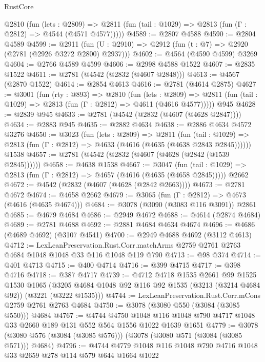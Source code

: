 \begin{lexlean}{RustCore}
\begin{coremodule}
    @2810
      (fun (lets : @2809) =>
      @2811 (fun (tail : @1029) => @2813 (fun (Γ : @2812) => @4544 (@4571 @4577)))))
@4589 := @2807 @4588
@4590 := @2804 @4589
@4599 := @2911 (fun (U : @2910) => @2912 (fun (t : @7) => @2920 (@2781 (@2926 @3272 @2800) @2937)))
@4602 := @4564 (@4590 @4599) @3269
@4604 := @2766 @4589 @4599
@4606 := @2998 @4588 @1522
@4607 := @2835 @1522
@4611 := @2781 (@4542 (@2832 (@4607 @2848)))
@4613 := @4567 (@2870 @1522)
@4614 := @2854 @4613
@4616 := @2781 (@4614 @2875)
@4627 := @3001
    (fun (rty : @893) =>
    @2810
      (fun (lets : @2809) =>
      @2811 (fun (tail : @1029) => @2813 (fun (Γ : @2812) => @4611 (@4616 @4577)))))
    @945
@4628 := @2839 @945
@4633 := @2781 (@4542 (@2832 (@4607 (@4628 @2847))))
@4634 := @2883 @945
@4635 := @2882 @4634
@4638 := @2886 @4634 @4572 @3276
@4650 := @3023
    (fun (lets : @2809) =>
    @2811
      (fun (tail : @1029) => @2813 (fun (Γ : @2812) => @4633 (@4616 (@4635 (@4638 @2843 @2845))))))
    @1538
@4657 := @2781 (@4542 (@2832 (@4607 (@4628 (@2842 (@1539 @2845))))))
@4658 := @4638 @1538
@4667 := @3047
    (fun (tail : @1029) => @2813 (fun (Γ : @2812) => @4657 (@4616 (@4635 (@4658 @2845)))))
    @2662
@4672 := @4542 (@2832 (@4607 (@4628 (@2842 @2663))))
@4673 := @2781 @4672
@4674 := @4658 @2662
@4679 := @3065 (fun (Γ : @2812) => @4673 (@4616 (@4635 @4674)))
@4684 := @3078 (@3090 (@3083 @116 @3091)) @2861
@4685 := @4679 @4684
@4686 := @2949 @4672
@4688 := @4614 (@2874 @4684)
@4689 := @2781 @4688
@4692 := @2881 @4684 @4634 @4674
@4696 := @4686 (@4689 @4692) (@3107 @4541)
@4700 := @2949 @4688 @4692 (@3112 @4613)
@4712 := LexLeanPreservation.Rust.Corr.matchArms
    @2759
    @2761
    @2763
    @4684
    @1048
    @1048
    @33
    @116
    @1048
    @119
    @790
@4713 := @98 @374
@4714 := @401 @4713
@4715 := @400 @4714
@4716 := @399 @4715
@4717 := @398 @4716
@4718 := @387 @4717
@4739 := @4712
    @4718
    @1535
    @2661
    @99
    @1525
    @1530
    @1065
    (@3205 @4684 @1048 @92 @116 @92 @1535 (@3213 (@3214 @4684 @92)) (@3221 (@3222 @1535)))
@4744 := LexLeanPreservation.Rust.Corr.mCons @2759 @2761 @2763 @4684
@4750 := @3078 (@3080 @550 (@3084 (@3085 @550))) @4684
@4767 := @4744
    @4750
    @1048
    @116
    @1048
    @790
    @4717
    @1048
    @33
    @2660
    @189
    @131
    @552
    @564
    @1556
    @1022
    @1639
    @1651
@4779 := @3078 (@3080 @576 (@3084 (@3085 @576))) (@3078 (@3080 @571 (@3084 (@3085 @571))) @4684)
@4796 := @4744
    @4779
    @1048
    @116
    @1048
    @790
    @4716
    @1048
    @33
    @2659
    @278
    @114
    @579
    @644
    @1664
    @1022

\end{coremodule}
\end{lexlean}

